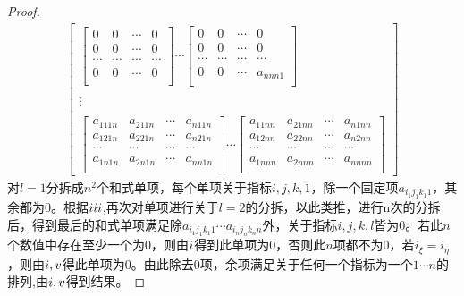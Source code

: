 \documentclass[twoside,a4paper,CCT]{cctart}   %
\begin{document}
\begin{proof}
\begin{equation}
\begin{aligned}
\begin{bmatrix}
  \begin{bmatrix}
   0& 0&\cdots&0\\
   0& 0&\cdots&0\\
  \cdots& \cdots&\cdots&\cdots \\
0& 0&\cdots&0\\
\end{bmatrix}
\cdots
 \begin{bmatrix}
   0& 0&\cdots&0\\
   0& 0&\cdots&0\\
  \cdots& \cdots&\cdots&\cdots \\
0& 0&\cdots&a_{nnn1}\\
\end{bmatrix}\\
\\
\vdots\\
\\
\begin{bmatrix}
  a_{111n}& a_{211n}&\cdots&a_{n11n}\\
  a_{121n}& a_{221n}&\cdots&a_{n21n}\\
  \cdots& \cdots&\cdots&\cdots \\
  a_{1n1n}& a_{2n1n}&\cdots&a_{nn1n}\\
  \end{bmatrix}
\cdots
\begin{bmatrix}
  a_{11nn}& a_{21nn}&\cdots&a_{n1nn}\\
  a_{12nn}& a_{22nn}&\cdots&a_{n2nn}\\
  \cdots& \cdots&\cdots&\cdots \\
   a_{1nnn}& a_{2nnn}&\cdots&a_{nnnn}\\
\end{bmatrix}
\end{bmatrix}
\end{aligned}
\end{equation}
对$l=1$分拆成$n^{2}$个和式单项，每个单项关于指标$i,j,k,1$，除一个固定项$a_{i_{1}j_{1}k_{1}1}$，其余都为0。根据$\uppercase\expandafter{\romannumeral3}$,再次对单项进行关于$l=2$的分拆，以此类推，进行n次的分拆后，得到最后的和式单项满足除$a_{i_{1}j_{1}k_{1}1} \cdots a_{i_{n}j_{n}k_{n}n}$外，关于指标$i,j,k,l$皆为0。若此$n$个数值中存在至少一个为0，则由$\uppercase\expandafter{\romannumeral1}$得到此单项为0，否则此$n$项都不为0，若$i_{\xi}=i_{\eta}$，则由$\uppercase\expandafter{\romannumeral1},\uppercase\expandafter{\romannumeral5}$得此单项为0。由此除去0项，余项满足关于任何一个指标为一个$1 \cdots n$的排列,由$\uppercase\expandafter{\romannumeral1},\uppercase\expandafter{\romannumeral5}$得到结果。
\end{proof}
\end{document}
